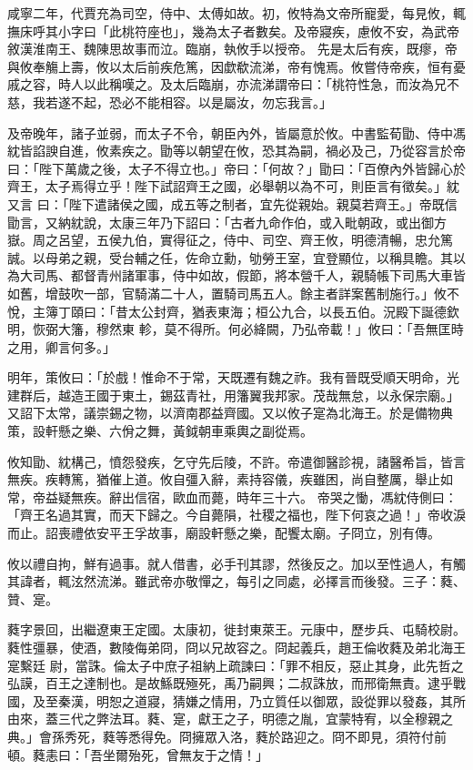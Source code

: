 \begin{pinyinscope}
 咸寧二年，代賈充為司空，侍中、太傅如故。初，攸特為文帝所寵愛，每見攸，輒撫床呼其小字曰「此桃符座也」，幾為太子者數矣。及帝寢疾，慮攸不安，為武帝敘漢淮南王、魏陳思故事而泣。臨崩，執攸手以授帝。
 先是太后有疾，既瘳，帝與攸奉觴上壽，攸以太后前疾危篤，因歔欷流涕，帝有愧焉。攸嘗侍帝疾，恒有憂戚之容，時人以此稱嘆之。及太后臨崩，亦流涕謂帝曰：「桃符性急，而汝為兄不慈，我若遂不起，恐必不能相容。以是屬汝，勿忘我言。」



 及帝晚年，諸子並弱，而太子不令，朝臣內外，皆屬意於攸。中書監荀勖、侍中馮紞皆諂諛自進，攸素疾之。勖等以朝望在攸，恐其為嗣，禍必及己，乃從容言於帝曰：「陛下萬歲之後，太子不得立也。」帝曰：「何故？」勖曰：「百僚內外皆歸心於齊王，太子焉得立乎！陛下試詔齊王之國，必舉朝以為不可，則臣言有徵矣。」紞又言
 曰：「陛下遣諸侯之國，成五等之制者，宜先從親始。親莫若齊王。」帝既信勖言，又納紞說，太康三年乃下詔曰：「古者九命作伯，或入毗朝政，或出御方嶽。周之呂望，五侯九伯，實得征之，侍中、司空、齊王攸，明德清暢，忠允篤誠。以母弟之親，受台輔之任，佐命立勳，劬勞王室，宜登顯位，以稱具瞻。其以為大司馬、都督青州諸軍事，侍中如故，假節，將本營千人，親騎帳下司馬大車皆如舊，增鼓吹一部，官騎滿二十人，置騎司馬五人。餘主者詳案舊制施行。」攸不悅，主簿丁頤曰：「昔太公封齊，猶表東海；桓公九合，以長五伯。況殿下誕德欽明，恢弼大籓，穆然東
 軫，莫不得所。何必絳闕，乃弘帝載！」攸曰：「吾無匡時之用，卿言何多。」



 明年，策攸曰：「於戲！惟命不于常，天既遷有魏之祚。我有晉既受順天明命，光建群后，越造王國于東土，錫茲青社，用籓翼我邦家。茂哉無怠，以永保宗廟。」又詔下太常，議崇錫之物，以濟南郡益齊國。又以攸子寔為北海王。於是備物典策，設軒懸之樂、六佾之舞，黃鉞朝車乘輿之副從焉。



 攸知勖、紞構己，憤怨發疾，乞守先后陵，不許。帝遣御醫診視，諸醫希旨，皆言無疾。疾轉篤，猶催上道。攸自彊入辭，素持容儀，疾雖困，尚自整厲，舉止如常，帝益疑無疾。辭出信宿，歐血而薨，時年三十六。
 帝哭之慟，馮紞侍側曰：「齊王名過其實，而天下歸之。今自薨隕，社稷之福也，陛下何哀之過！」帝收淚而止。詔喪禮依安平王孚故事，廟設軒懸之樂，配饗太廟。子冏立，別有傳。



 攸以禮自拘，鮮有過事。就人借書，必手刊其謬，然後反之。加以至性過人，有觸其諱者，輒泫然流涕。雖武帝亦敬憚之，每引之同處，必擇言而後發。三子：蕤、贊、寔。



 蕤字景回，出繼遼東王定國。太康初，徙封東萊王。元康中，歷步兵、屯騎校尉。蕤性彊暴，使酒，數陵侮弟冏，冏以兄故容之。冏起義兵，趙王倫收蕤及弟北海王寔繫廷
 尉，當誅。倫太子中庶子祖納上疏諫曰：「罪不相反，惡止其身，此先哲之弘謨，百王之達制也。是故鯀既殛死，禹乃嗣興；二叔誅放，而邢衛無責。逮乎戰國，及至秦漢，明恕之道寢，猜嫌之情用，乃立質任以御眾，設從罪以發姦，其所由來，蓋三代之弊法耳。蕤、寔，獻王之子，明德之胤，宜蒙特宥，以全穆親之典。」會孫秀死，蕤等悉得免。冏擁眾入洛，蕤於路迎之。冏不即見，須符付前頓。蕤恚曰：「吾坐爾殆死，曾無友于之情！」




\end{pinyinscope}
